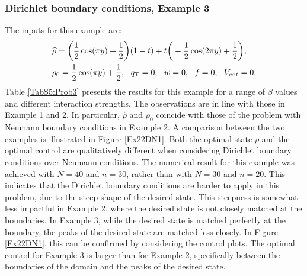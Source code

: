 \subsubsection{Dirichlet boundary conditions, Example 3} 
The inputs for this example are:
\begin{align*}
&\widehat \rho = \bigg(\frac{1}{2}\cos(\pi y) + \frac{1}{2}\bigg)(1-t) + t\bigg(-\frac{1}{2}\cos(2 \pi y) + \frac{1}{2}\bigg),\\
&\rho_{0} = \frac{1}{2}\cos(\pi y) + \frac{1}{2},\ \
q_{T} = 0,\ \
\vec{w} = 0,\ \
f =0,\ \
V_{ext} =0.
\end{align*}
Table \ref{TabS5:Prob3} presents the results for this example for a range of $\beta$ values and different interaction strengths. The observations are in line with those in Example 1 and 2. In particular, $ \widehat \rho$ and $\rho_0$ coincide with those of the problem with Neumann boundary conditions in Example 2. A comparison between the two examples is illustrated in Figure \ref{Ex22DN1}. Both the optimal state $\rho$ and the optimal control are qualitatively different when considering Dirichlet boundary conditions over Neumann conditions. The numerical result for this example was achieved with $N=40$ and $n = 30$, rather than with $N=30$ and $n=20$. This indicates that the Dirichlet boundary conditions are harder to apply in this problem, due to the steep shape of the desired state. This steepness is somewhat less impactful in Example 2, where the desired state is not closely matched at the boundaries. In Example 3, while the desired state is matched perfectly at the boundary, the peaks of the desired state are matched less closely. In Figure \ref{Ex22DN1}, this can be confirmed by considering the control plots. The optimal control for Example 3 is larger than for Example 2, specifically between the boundaries of the domain and the peaks of the desired state.
